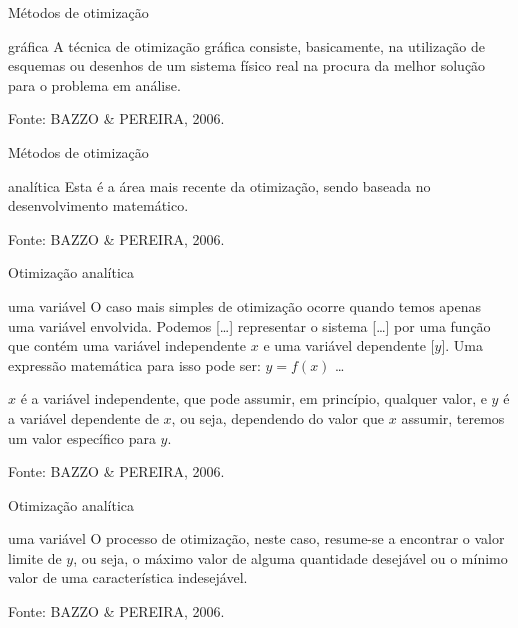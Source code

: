 \documentclass{beamer}
\begin{document}
\begin{frame}{Métodos de otimização}
  \begin{block}{gráfica}
    A técnica de otimização gráfica consiste, basicamente, na
    utilização de esquemas ou desenhos de um sistema físico real na
    procura da melhor solução para o problema em análise.
  \end{block}

\vfill
Fonte: BAZZO \& PEREIRA, 2006.
\end{frame}

\begin{frame}{Métodos de otimização}
  \begin{block}{analítica}
    Esta é a área mais recente da otimização, sendo baseada no
    desenvolvimento matemático.
  \end{block}

\vfill
Fonte: BAZZO \& PEREIRA, 2006.
\end{frame}

\begin{frame}{Otimização analítica}
  \begin{block}{uma variável}
    O caso mais simples de otimização ocorre quando temos apenas uma
    variável envolvida. Podemos [\ldots] representar o sistema
    [\ldots] por uma função que contém uma variável independente $x$ e
    uma variável dependente [$y$]. Uma expressão matemática para isso
    pode ser: $y = f (x)$ \ldots
  \end{block}
  \begin{block}{}
    $x$ é a variável independente, que pode assumir, em princípio,
    qualquer valor, e $y$ é a variável dependente de $x$, ou seja,
    dependendo do valor que $x$ assumir, teremos um valor específico
    para $y$.
  \end{block}

\vfill
Fonte: BAZZO \& PEREIRA, 2006.
\end{frame}

\begin{frame}{Otimização analítica}
    \begin{block}{uma variável}
    O processo de otimização, neste caso, resume-se a encontrar o
    valor limite de $y$, ou seja, o máximo valor de alguma quantidade
    desejável ou o mínimo valor de uma característica indesejável.
  \end{block}

\vfill
Fonte: BAZZO \& PEREIRA, 2006.
\end{frame}
\end{document}
